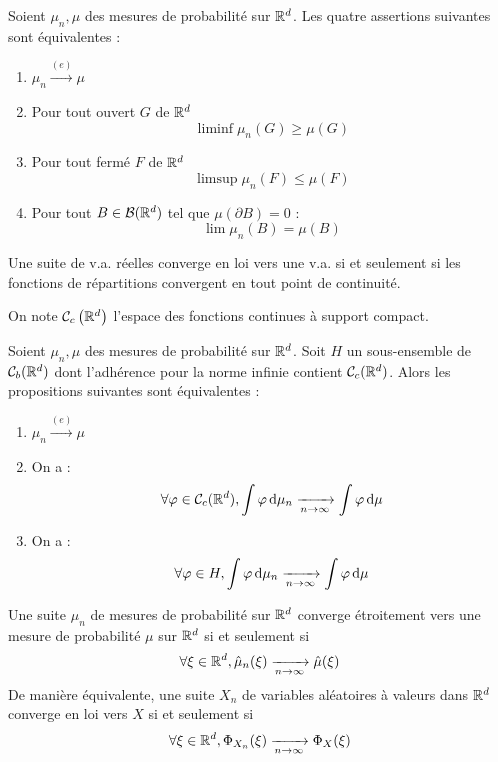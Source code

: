 \documentclass{cours}
\begin{document}
\begin{theorem}
    Soient $\mu_{n}, \mu$ des mesures de probabilité sur $\mathbb{R}^{d}$. Les quatre assertions suivantes sont équivalentes :
    \begin{enumerate}
        \item $\mu_{n} \xrightarrow{(e)} \mu$
        \item Pour tout ouvert $G$ de $\mathbb{R}^{d}$
              \[
                  \liminf \mu_{n}(G) \geq \mu(G)
              \]
        \item Pour tout fermé $F$ de $\mathbb{R}^{d}$
              \[
                  \limsup \mu_{n}(F) \leq \mu(F)
              \]
        \item Pour tout $B \in \mathcal{B}(\mathbb{R}^{d})$ tel que $\mu\left(\partial B\right) = 0$ :
              \[
                  \lim \mu_{n}(B) = \mu(B)
              \]
    \end{enumerate}
\end{theorem}

\begin{proposition}
    Une suite de v.a. réelles converge en loi vers une v.a. si et seulement si les fonctions de répartitions convergent en tout point de continuité.
\end{proposition}

On note $\mathcal{C}_{c}\left(\mathbb{R}^{d}\right)$ l'espace des fonctions continues à support compact.

\begin{proposition}
    Soient $\mu_{n}, \mu$ des mesures de probabilité sur $\mathbb{R}^{d}$. Soit $H$ un sous-ensemble de $\mathcal{C}_{b}(\mathbb{R}^{d})$ dont l'adhérence pour la norme infinie contient $\mathcal{C}_{c}(\mathbb{R}^{d})$. Alors les propositions suivantes sont équivalentes :
    \begin{enumerate}
        \item $\mu_{n}\xrightarrow{(e)} \mu$
        \item On a :
              \[
                  \forall \varphi \in \mathcal{C}_{c}(\mathbb{R}^{d}), \int \varphi {\rm \, d}\mu_{n} \xrightarrow[n \to \infty]{}\int \varphi {\rm \, d}\mu
              \]
        \item On a :
              \[
                  \forall \varphi \in H, \int \varphi {\rm \, d} \mu_{n} \xrightarrow[n\to \infty]{}\int \varphi {\rm \, d} \mu
              \]
    \end{enumerate}
\end{proposition}

\begin{theorem}[Lévy]
    Une suite $\mu_{n}$ de mesures de probabilité sur $\mathbb{R}^{d}$ converge étroitement vers une mesure de probabilité $\mu$ sur $\mathbb{R}^{d}$ si et seulement si
    \[
        \forall \xi \in \mathbb{R}^{d}, \hat{\mu}_{n}(\xi) \xrightarrow[n \to \infty]{}\hat{\mu}(\xi)
    \]
    De manière équivalente, une suite $X_{n}$ de variables aléatoires à valeurs dans $\mathbb{R}^{d}$ converge en loi vers $X$ si et seulement si
    \[
        \forall \xi \in \mathbb{R}^{d}, \Phi_{X_{n}}(\xi) \xrightarrow[n \to \infty]{} \Phi_{X}(\xi)
    \]
\end{theorem}
\end{document}
